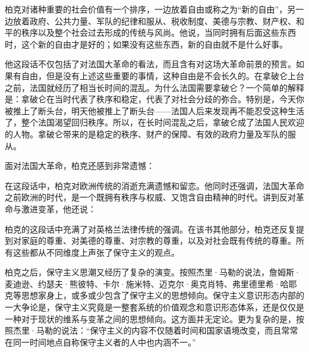 柏克对诸种重要的社会价值有一个排序，一边放着自由或称之为“新的自由”，另一边放着政府、公共力量、军队的纪律和服从、税收制度、美德与宗教、财产权、和平的秩序以及整个社会过去形成的传统与风尚。他说，当同时拥有后面这些东西时，这个新的自由才是好的；如果没有这些东西，新的自由就不是什么好事。

他这段话不仅包括了对法国大革命的看法，而且含有对这场大革命前景的预言。如果有自由，但是没有上述这些重要的事情，这种自由是不会长久的。在拿破仑上台之前，法国就经历了相当长时间的混乱。为什么法国需要拿破仑？一个简单的解释是：拿破仑在当时代表了秩序和稳定，代表了对社会分歧的弥合。特别是，今天你被推上了断头台，明天他被推上了断头台——法国人后来发现再不能忍受这种生活了，整个法国渴望回归秩序。所以，在长时间混乱之后，拿破仑成了法国人民欢迎的人物。拿破仑带来的是稳定的秩序、财产的保障、有效的政府力量及军队的服从。

面对法国大革命，柏克还感到非常遗憾：


在这段话中，柏克对欧洲传统的消逝充满遗憾和留恋。他同时还强调，法国大革命之前欧洲的时代，是一个既拥有秩序与权威、又饱含自由精神的时代。讲到反对革命与激进变革，他还说：


柏克的这段话中充满了对英格兰法律传统的强调。在该书其他部分，柏克还反复提到对家庭的尊重、对美德的尊重、对宗教的尊重，以及对社会既有传统的尊重。所有这些都从不同维度上声张了保守主义的观点。

柏克之后，保守主义思潮又经历了复杂的演变。按照杰里·马勒的说法，詹姆斯·麦迪逊、约瑟夫·熊彼特、卡尔·施米特、迈克尔·奥克肖特、弗里德里希·哈耶克等思想家身上，或多或少包含了保守主义的思想倾向。保守主义意识形态内部的一大争论是，保守主义究竟是一整套系统的价值观念和意识形态体系，还是仅仅是一种对于现状的维系与变革之间的思想倾向。这方面并无定论。更为复杂的是，按照杰里·马勒的说法：“保守主义的内容不仅随着时间和国家语境改变，而且常常在同一时间地点自称保守主义者的人中也内涵不一。”

